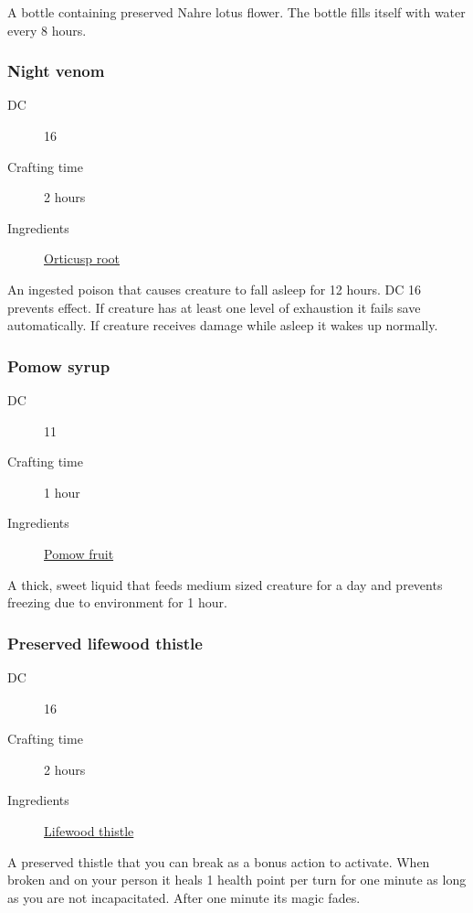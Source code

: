 A bottle containing preserved Nahre lotus flower. The bottle fills itself with water every 8 hours.

\subsubsection{Night venom}
\label{Night venom}

\begin{description}
\item [DC] 16 \nature
\item [Crafting time] 2 hours
\item [Ingredients] \hyperref[Orticusp]{Orticusp root}
\end{description}

An ingested poison that causes creature to fall asleep for 12 hours. DC 16 \constitutionsave prevents effect. 
If creature has at least one level of exhaustion it fails save automatically. 
If creature receives damage while asleep it wakes up normally.

\subsubsection{Pomow syrup}
\label{Pomow syrup}

\begin{description}
\item [DC] 11 \survival
\item [Crafting time] 1 hour
\item [Ingredients] \hyperref[Pomow]{Pomow fruit}
\end{description}

A thick, sweet liquid that feeds medium sized creature for a day and prevents freezing 
due to environment for 1 hour.

\subsubsection{Preserved lifewood thistle}
\label{Preserved lifewood thistle}

\begin{description}
\item [DC] 16 \medicine
\item [Crafting time] 2 hours
\item [Ingredients] \hyperref[Lifewood]{Lifewood thistle}
\end{description}

A preserved thistle that you can break as a bonus action to activate. 
When broken and on your person it heals 1 health point per turn for one minute 
as long as you are not incapacitated. After one minute its magic fades.

